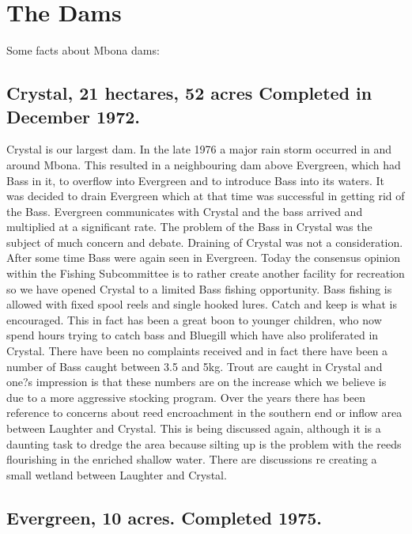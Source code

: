 \section{The Dams}

Some facts about Mbona dams:

\subsection*{Crystal,  21 hectares, 52 acres Completed in December 1972.}

Crystal is our largest dam. In the late 1976 a major rain storm occurred in and around Mbona. 
This resulted in a neighbouring dam above Evergreen, which had Bass in it, to overflow into Evergreen 
and to introduce Bass into its waters. It was decided to drain Evergreen which at that time was 
successful in getting rid of the Bass. Evergreen communicates with Crystal and the bass arrived 
and multiplied at a significant rate. The problem of the Bass in Crystal was the subject of much concern and debate. 
Draining of Crystal was not a consideration. After some time Bass were again seen in Evergreen. 
Today the consensus opinion within the Fishing Subcommittee is to rather create another facility for 
recreation so we have opened Crystal to a limited Bass fishing opportunity. 
Bass fishing is allowed with fixed spool reels and single hooked lures. Catch and keep is what is encouraged. 
This in fact has been a great boon to younger children, who now spend hours trying to catch bass and Bluegill 
which have also proliferated in Crystal. There have been no complaints received and in fact there have 
been a number of Bass caught between 3.5 and 5kg. Trout are caught in Crystal and one?s impression 
is that these numbers are on the increase which we believe is due to a more aggressive stocking program. 
Over the years there has been reference to concerns about reed encroachment in the southern end or inflow area between 
Laughter and Crystal. This is being discussed again, although it is a daunting task to dredge the area because 
silting up is the problem with the reeds flourishing in the enriched shallow water. 
There are discussions re creating a small wetland between Laughter and Crystal.

\subsection*{Evergreen,  10 acres. Completed 1975.}

